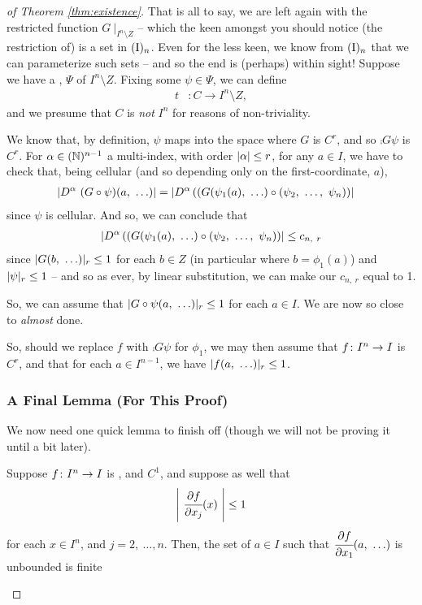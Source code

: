 \begin{proof}[of Theorem \ref{thm:existence}]
     That is all to say, we are left again with the restricted function $G \ \vert_{I^n \setminus Z}$ -- which the keen amongst you should notice (the restriction of) is a set in $\In[n]$. Even for the less keen, we know from $\In[n]$ that we can parameterize such sets -- and so the end is (perhaps) within sight! Suppose we have a \cellrparam, $\Psi$ of $I^n \setminus Z$. Fixing some $\psi \in \Psi$, we can define
      \begin{align*}
        t &\colon C \to I^n \setminus Z,
      \end{align*}
    and we presume that $C$ is \emph{not} $I^n$ for reasons of non-triviality.

    We know that, by definition, $\psi$ maps into the space where $G$ is $C^r$, and so $\comp{G}{\psi}$ is $C^r$. For $\alpha \in (\N)^{n-1}$ a multi-index, with order $\abs{\alpha} \leq r$, for any $a \in I$, we have to check that, being cellular (and so depending only on the first-coordinate, $a$),
      \begin{align*}
        \abs{D^{\alpha} \ (\comp{G}{\psi})(a, \ \hdots)} &= \abs{D^{\alpha} \left( \comp{(G(\psi_1(a), \ \hdots)}{(\vmvn{\psi}{2}{n})} \right)}
      \end{align*}
    since $\psi$ is cellular. And so, we can conclude that
      \begin{align*}
        \abs{D^{\alpha} \left( \comp{(G(\psi_1(a), \ \hdots)}{(\vmvn{\psi}{2}{n})} \right)} \leq c_{n, \ r}
      \end{align*}
    since $\rnorm{G(b, \ \hdots)} \leq 1$ for each $b \in Z$ (in particular where $b = \phi_1(a)$) and $\rnorm{\psi} \leq 1$ -- and so as ever, by linear substitution, we can make our $c_{n, \ r}$ equal to 1.

    So, we can assume that $\rnorm{\comp{G}{\psi}(a, \ \hdots)} \leq 1$ for each $a \in I$. We are now so close to \emph{almost} done.

    So, should we replace $f$ with $\comp{G}{\psi}$ for $\phi_1$, we may then assume that $\funcdom{f}{I^n}{I}$ is $C^r$, and that for each $a \in I^{n - 1}$, we have $\rnorm{f(a, \ \hdots)} \leq 1$.

    \subsubsection{A Final Lemma (For This Proof)}

    We now need one quick lemma to finish off (though we will not be proving it until a bit later).
    \begin{lemma}
      Suppose $\funcdom{f}{I^n}{I}$ is , and $C^1$, and suppose as well that
      \begin{align*}
        \left\vert \ \cfrac{\partial f}{\partial x_j}(x) \ \right\vert \leq 1
      \end{align*}
      for each $x \in I^n$, and $j = 2, \ \hdots, n$. Then, the set of $a \in I$ such that $\cfrac{\partial f}{\partial x_1}(a, \ \hdots)$ is unbounded is finite


\end{lemma}
\end{proof}
